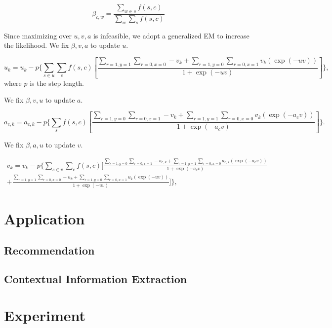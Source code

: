 \documentclass{llncs}
\begin{document}
\begin{equation}\label{equ:mstepbeta}
\beta_{c,w}=\frac{\sum_{w\in s} f(s,c)}{\sum_{w} \sum_s f(s,c)}
\end{equation}

Since maximizing over $u,v,a$ is infeasible, we adopt a generalized EM to increase the likelihood. We fix $\beta, v, a $ to update $u$.

\begin{equation}\label{equ:mstepu}
u_k = u_k - p \{\sum_{s\in u} \sum_c f(s,c) [\frac{\sum_{r=1,y=1}\sum_{r=0,x=0}-v_k+\sum_{r=1,y=0}\sum_{r=0,x=1}v_k(\exp{(-uv)})}{1+\exp{(-uv)}}]\},
\end{equation}
where $p$ is the step length.

We fix $\beta, v, u $ to update $a$.

\begin{equation}\label{equ:mstepa}
a_{c,k} = a_{c,k} - p \{\sum_s  f(s,c) [\frac{\sum_{r=1,y=0}\sum_{r=0,x=1}-v_k+\sum_{r=1,y=1}\sum_{r=0,x=0}v_k(\exp{(-a_c v)})}{1+\exp{(-a_c v)}}]\}.
\end{equation}

We fix $\beta, a, u $ to update $v$.

\begin{eqnarray}\label{equ:mstepa}
v_k = v_k - p \{\sum_{s\in v} \sum_c f(s,c) [\frac{\sum_{r=1,y=0}\sum_{r=0,x=1}-a_{c,k}+\sum_{r=1,y=1}\sum_{r=0,x=0}a_{c,k}(\exp{(-a_c v)})}{1+\exp{(-a_c v)}} \\ \nonumber
+ \frac{\sum_{r=1,y=1}\sum_{r=0,x=0}-u_k+\sum_{r=1,y=0}\sum_{r=0,x=1}u_k(\exp{(-uv)})}{1+\exp{(-uv)}}  ]\},
\end{eqnarray}



\section{Application}\label{sec:method}
%

 
 
\subsection{ Recommendation}
\subsection{Contextual Information Extraction}


\section{Experiment}\label{sec:exp}
\end{document}
